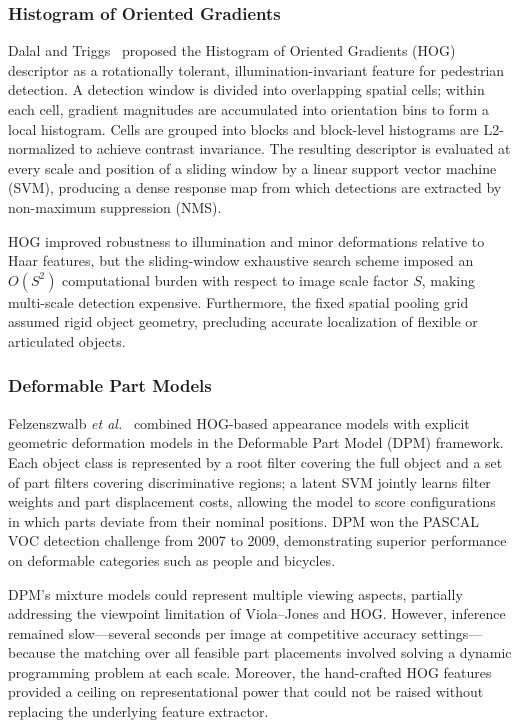 \subsubsection{Histogram of Oriented Gradients}

Dalal and Triggs~\cite{dalal2005histograms} proposed the
Histogram of Oriented Gradients (HOG) descriptor as a
rotationally tolerant, illumination-invariant feature for
pedestrian detection.  A detection window is divided into
overlapping spatial cells; within each cell, gradient
magnitudes are accumulated into orientation bins to form a
local histogram.  Cells are grouped into blocks and
block-level histograms are L2-normalized to achieve contrast
invariance.  The resulting descriptor is evaluated at every
scale and position of a sliding window by a linear support
vector machine (SVM), producing a dense response map from
which detections are extracted by non-maximum suppression
(NMS).

HOG improved robustness to illumination and minor deformations
relative to Haar features, but the sliding-window exhaustive
search scheme imposed an $O(S^2)$ computational burden with
respect to image scale factor $S$, making multi-scale detection
expensive.  Furthermore, the fixed spatial pooling grid assumed
rigid object geometry, precluding accurate localization of
flexible or articulated objects.

\subsubsection{Deformable Part Models}

Felzenszwalb \textit{et al.}~\cite{felzenszwalb2010object}
combined HOG-based appearance models with explicit geometric
deformation models in the Deformable Part Model (DPM)
framework.  Each object class is represented by a root filter
covering the full object and a set of part filters covering
discriminative regions; a latent SVM jointly learns filter
weights and part displacement costs, allowing the model to
score configurations in which parts deviate from their nominal
positions.  DPM won the PASCAL VOC detection challenge from
2007 to 2009, demonstrating superior performance on
deformable categories such as people and bicycles.

DPM's mixture models could represent multiple viewing aspects,
partially addressing the viewpoint limitation of Viola--Jones
and HOG.  However, inference remained slow---several seconds
per image at competitive accuracy settings---because the
matching over all feasible part placements involved solving a
dynamic programming problem at each scale.  Moreover, the
hand-crafted HOG features provided a ceiling on representational
power that could not be raised without replacing the underlying
feature extractor.

